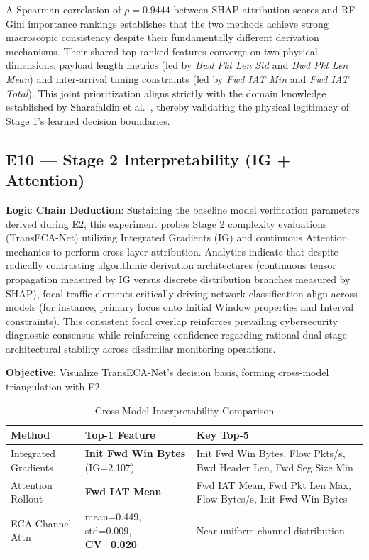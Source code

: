 \documentclass[sigconf]{acmart}
\begin{document}
A Spearman correlation of $\rho = 0.9444$ between SHAP attribution scores and RF Gini importance rankings establishes that the two methods achieve strong macroscopic consistency despite their fundamentally different derivation mechanisms. Their shared top-ranked features converge on two physical dimensions: payload length metrics (led by \textit{Bwd Pkt Len Std} and \textit{Bwd Pkt Len Mean}) and inter-arrival timing constraints (led by \textit{Fwd IAT Min} and \textit{Fwd IAT Total}). This joint prioritization aligns strictly with the domain knowledge established by Sharafaldin et al.\ \cite{1}, thereby validating the physical legitimacy of Stage 1's learned decision boundaries.

\subsection{E10 --- Stage 2 Interpretability (IG + Attention)}
\textbf{Logic Chain Deduction}: Sustaining the baseline model verification parameters derived during E2, this experiment probes Stage 2 complexity evaluations (TransECA-Net) utilizing Integrated Gradients (IG) and continuous Attention mechanics to perform cross-layer attribution. Analytics indicate that despite radically contrasting algorithmic derivation architectures (continuous tensor propagation measured by IG versus discrete distribution branches measured by SHAP), focal traffic elements critically driving network classification align across models (for instance, primary focus onto Initial Window properties and Interval constraints). This consistent focal overlap reinforces prevailing cybersecurity diagnostic consensus while reinforcing confidence regarding rational dual-stage architectural stability across dissimilar monitoring operations.

\textbf{Objective}: Visualize TransECA-Net's decision basis, forming cross-model triangulation with E2.


\begin{table}[!t]
\caption{Cross-Model Interpretability Comparison}
\label{tab:interpretability_comparison}
\begin{tabular}{p{3.5cm}p{4.5cm}p{8.4cm}}
\toprule
\textbf{Method} & \textbf{Top-1 Feature} & \textbf{Key Top-5} \\
\midrule
Integrated Gradients & \textbf{Init Fwd Win Bytes} (IG=2.107) & Init Fwd Win Bytes, Flow Pkts/s, Bwd Header Len, Fwd Seg Size Min \\
Attention Rollout & \textbf{Fwd IAT Mean} & Fwd IAT Mean, Fwd Pkt Len Max, Flow Bytes/s, Init Fwd Win Bytes \\
ECA Channel Attn & mean=0.449, std=0.009, \textbf{CV=0.020} & Near-uniform channel distribution \\
\bottomrule
\end{tabular}
\end{table}
\end{document}

